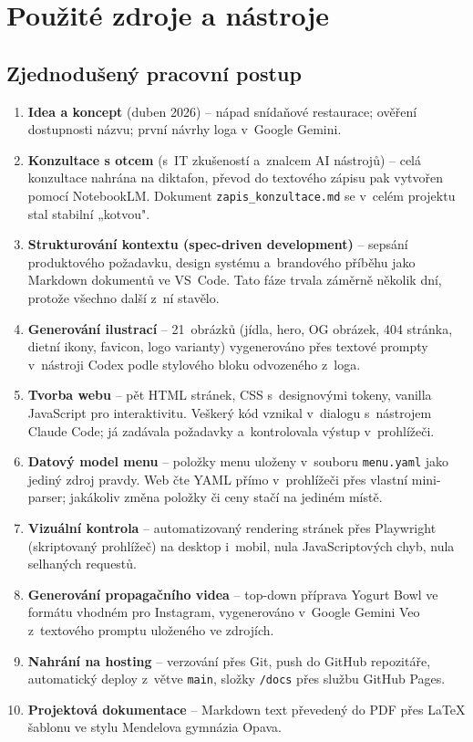 \documentclass[12pt,a4paper]{article}
\begin{document}
\FloatBarrier
\clearpage

\section{Použité zdroje a nástroje}

\subsection{Zjednodušený pracovní postup}

\begin{enumerate}[label=\arabic*.]
  \item \textbf{Idea a koncept} (duben 2026) -- nápad snídaňové restaurace; ověření dostupnosti názvu; první návrhy loga v~Google Gemini.
  \item \textbf{Konzultace s otcem} (s~IT zkušeností a~znalcem AI nástrojů) -- celá konzultace nahrána na diktafon, převod do textového zápisu pak vytvořen pomocí NotebookLM. Dokument \texttt{zapis\_konzultace.md} se v~celém projektu stal stabilní „kotvou".
  \item \textbf{Strukturování kontextu (spec-driven development)} -- sepsání produktového požadavku, design systému a~brandového příběhu jako Markdown dokumentů ve VS~Code. Tato fáze trvala záměrně několik dní, protože všechno další z~ní stavělo.
  \item \textbf{Generování ilustrací} -- 21~obrázků (jídla, hero, OG obrázek, 404 stránka, dietní ikony, favicon, logo varianty) vygenerováno přes textové prompty v~nástroji Codex podle stylového bloku odvozeného z~loga.
  \item \textbf{Tvorba webu} -- pět HTML stránek, CSS s~designovými tokeny, vanilla JavaScript pro interaktivitu. Veškerý kód vznikal v~dialogu s~nástrojem Claude Code; já zadávala požadavky a~kontrolovala výstup v~prohlížeči.
  \item \textbf{Datový model menu} -- položky menu uloženy v~souboru \texttt{menu.yaml} jako jediný zdroj pravdy. Web čte YAML přímo v~prohlížeči přes vlastní mini-parser; jakákoliv změna položky či ceny stačí na jediném místě.
  \item \textbf{Vizuální kontrola} -- automatizovaný rendering stránek přes Playwright (skriptovaný prohlížeč) na desktop i~mobil, nula JavaScriptových chyb, nula selhaných requestů.
  \item \textbf{Generování propagačního videa} -- top-down příprava Yogurt Bowl ve formátu vhodném pro Instagram, vygenerováno v~Google Gemini Veo z~textového promptu uloženého ve zdrojích.
  \item \textbf{Nahrání na hosting} -- verzování přes Git, push do GitHub repozitáře, automatický deploy z~větve \texttt{main}, složky \texttt{/docs} přes službu GitHub Pages.
  \item \textbf{Projektová dokumentace} -- Markdown text převedený do PDF přes LaTeX šablonu ve stylu Mendelova gymnázia Opava.
\end{enumerate}
\end{document}
